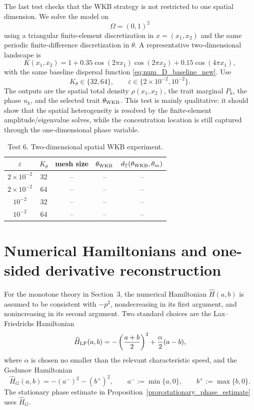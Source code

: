 \documentclass[11pt]{article}
\begin{document}
The last test checks that the WKB strategy is not restricted to one spatial dimension.  We solve the model on
\[
    \Omega=(0,1)^2
\]
using a triangular finite-element discretization in \(x=(x_1,x_2)\) and the same periodic finite-difference discretization in \(\theta\).  A representative two-dimensional landscape is
\begin{equation}\label{eq:K_2d_new}
    K(x_1,x_2)=1+0.35\cos(2\pi x_1)\cos(2\pi x_2)+0.15\cos(4\pi x_1),
\end{equation}
with the same baseline dispersal function \eqref{eq:num_D_baseline_new}.  Use
\[
    K_\theta\in\{32,64\},
    \qquad
    \varepsilon\in\{2\times10^{-2},10^{-2}\}.
\]
The outputs are the spatial total density \(\rho(x_1,x_2)\), the trait marginal \(P_k\), the phase \(u_k\), and the selected trait \(\theta_{\rm WKB}\).  This test is mainly qualitative: it should show that the spatial heterogeneity is resolved by the finite-element amplitude/eigenvalue solves, while the concentration location is still captured through the one-dimensional phase variable.

\begin{table}[ht]
\centering
\caption{Test 6. Two-dimensional spatial WKB experiment.}
\begin{tabular}{ccccc}
\toprule
$\varepsilon$ & $K_\theta$ & mesh size & $\theta_{\rm WKB}$ & $d_{\mathbb T}(\theta_{\rm WKB},\theta_m)$\\
\midrule
$2\times10^{-2}$ & 32 & -- & -- & --\\
$2\times10^{-2}$ & 64 & -- & -- & --\\
$10^{-2}$ & 32 & -- & -- & --\\
$10^{-2}$ & 64 & -- & -- & --\\
\bottomrule
\end{tabular}
\end{table}


\appendix

\section{Numerical Hamiltonians and one-sided derivative reconstruction}\label{app:hamiltonian_weno}

For the monotone theory in Section~3, the numerical Hamiltonian \(\widehat H(a,b)\) is assumed to be consistent with \(-p^2\), nondecreasing in its first argument, and nonincreasing in its second argument.  Two standard choices are the Lax--Friedrichs Hamiltonian
\begin{equation}\label{eq:app_LF_H_new}
    \widehat H_{\rm LF}(a,b)
    =-\left(\frac{a+b}{2}\right)^2+\frac{\alpha}{2}(a-b),
\end{equation}
where \(\alpha\) is chosen no smaller than the relevant characteristic speed, and the Godunov Hamiltonian
\begin{equation}\label{eq:app_Godunov_H_new}
    \widehat H_G(a,b)=-(a^-)^2-(b^+)^2,
    \qquad
    a^-:=\min\{a,0\},
    \qquad
    b^+:=\max\{b,0\}.
\end{equation}
The stationary phase estimate in Proposition~\ref{prop:stationary_phase_estimate} uses \(\widehat H_G\).
\end{document}

